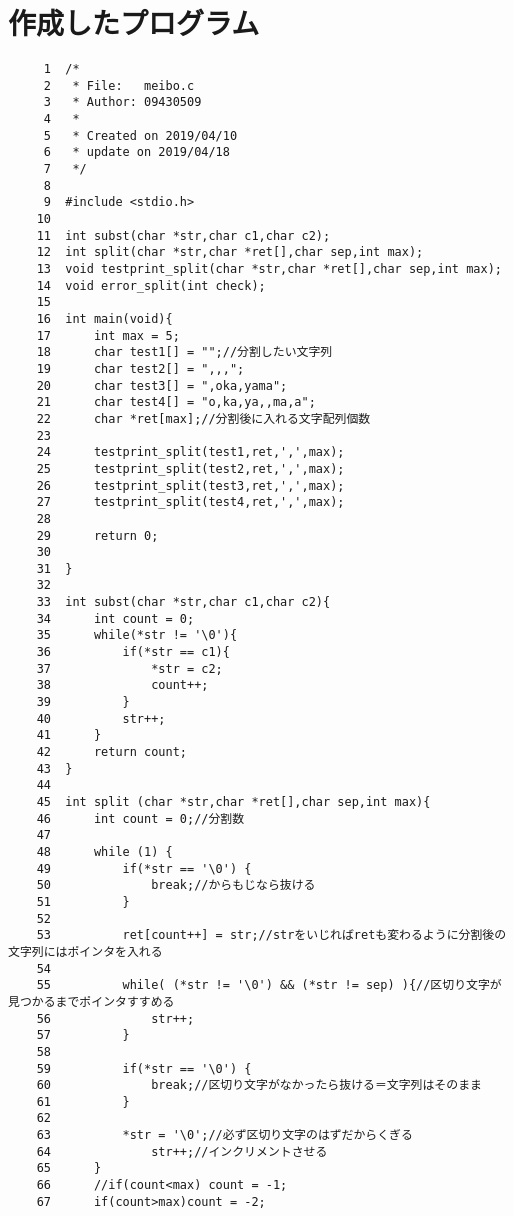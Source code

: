\documentclass[a4j,11pt]{jarticle}
\begin{document}
\section{作成したプログラム} \label{sec:sourcecode}
{\fontsize{10pt}{11pt} \selectfont
\begin{verbatim}
     1  /*
     2   * File:   meibo.c
     3   * Author: 09430509
     4   *
     5   * Created on 2019/04/10
     6   * update on 2019/04/18
     7   */
     8
     9  #include <stdio.h>
    10
    11  int subst(char *str,char c1,char c2);
    12  int split(char *str,char *ret[],char sep,int max);
    13  void testprint_split(char *str,char *ret[],char sep,int max);
    14  void error_split(int check);
    15
    16  int main(void){
    17      int max = 5;
    18      char test1[] = "";//分割したい文字列
    19      char test2[] = ",,,";
    20      char test3[] = ",oka,yama";
    21      char test4[] = "o,ka,ya,,ma,a";
    22      char *ret[max];//分割後に入れる文字配列個数
    23
    24      testprint_split(test1,ret,',',max);
    25      testprint_split(test2,ret,',',max);
    26      testprint_split(test3,ret,',',max);
    27      testprint_split(test4,ret,',',max);
    28
    29      return 0;
    30
    31  }
    32
    33  int subst(char *str,char c1,char c2){
    34      int count = 0;
    35      while(*str != '\0'){
    36          if(*str == c1){
    37              *str = c2;
    38              count++;
    39          }
    40          str++;
    41      }
    42      return count;
    43  }
    44
    45  int split (char *str,char *ret[],char sep,int max){
    46      int count = 0;//分割数
    47
    48      while (1) {
    49          if(*str == '\0') {
    50              break;//からもじなら抜ける
    51          }
    52
    53          ret[count++] = str;//strをいじればretも変わるように分割後の文字列にはポインタを入れる
    54
    55          while( (*str != '\0') && (*str != sep) ){//区切り文字が見つかるまでポインタすすめる
    56              str++;
    57          }
    58
    59          if(*str == '\0') {
    60              break;//区切り文字がなかったら抜ける＝文字列はそのまま
    61          }                                                               
    62
    63          *str = '\0';//必ず区切り文字のはずだからくぎる
    64              str++;//インクリメントさせる
    65      }
    66      //if(count<max) count = -1;
    67      if(count>max)count = -2;

\end{verbatim}}
\end{document}
